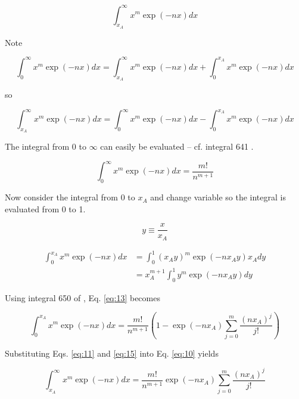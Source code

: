 \documentclass[letterpaper,12pt]{article}
\begin{document}
\begin{equation} \label{eq:08}
\int_{x_{A}}^{\infty} x^{m} \exp(-nx) dx
\end{equation}

\noindent Note

\begin{equation} \label{eq:09}
\int_{0}^{\infty} x^{m} \exp(-nx) dx = \int_{x_{A}}^{\infty} x^{m} \exp(-nx) dx + \int_{0}^{x_{A}} x^{m} \exp(-nx) dx
\end{equation}

\noindent so

\begin{equation} \label{eq:10}
\int_{x_{A}}^{\infty} x^{m} \exp(-nx) dx = \int_{0}^{\infty} x^{m} \exp(-nx) dx - \int_{0}^{x_{A}} x^{m} \exp(-nx) dx
\end{equation}

The integral from 0 to $\infty$ can easily be evaluated -- cf. integral 641 \cite{9790849324795}.

\begin{equation} \label{eq:11}
\int_{0}^{\infty} x^{m} \exp(-nx) dx = \frac{m!}{n^{m+1}}
\end{equation}

Now consider the integral from 0 to $x_{A}$ and change variable so the integral is evaluated from 0 to 1.

\begin{equation} \label{eq:12}
y \equiv \frac{x}{x_{A}}
\end{equation}

\begin{align} \label{eq:13}
\int_{0}^{x_{A}} x^{m} \exp(-nx) dx &= \int_{0}^{1} (x_{A}y)^{m} \exp(-nx_{A}y) x_{A} dy \nonumber \\
 &= x_{A}^{m+1} \int_{0}^{1} y^{m} \exp(-nx_{A}y) dy
\end{align}

\noindent Using integral 650 of \cite{9790849324795}, Eq. \ref{eq:13} becomes

\begin{equation} \label{eq:15}
\int_{0}^{x_{A}} x^{m} \exp(-nx) dx = \frac{m!}{n^{m+1}} \left(1 - \exp(-n x_{A}) \sum_{j = 0}^{m} \frac{(n x_{A})^{j}}{j!} \right) 
\end{equation}

\noindent Substituting Eqs. \ref{eq:11} and \ref{eq:15} into Eq. \ref{eq:10} yields

\begin{equation} \label{eq:31}
\int_{x_{A}}^{\infty} x^{m} \exp(-nx) dx = \frac{m!}{n^{m+1}} \exp(-n x_{A}) \sum_{j = 0}^{m} \frac{(n x_{A})^{j}}{j!}
\end{equation}
\end{document}
